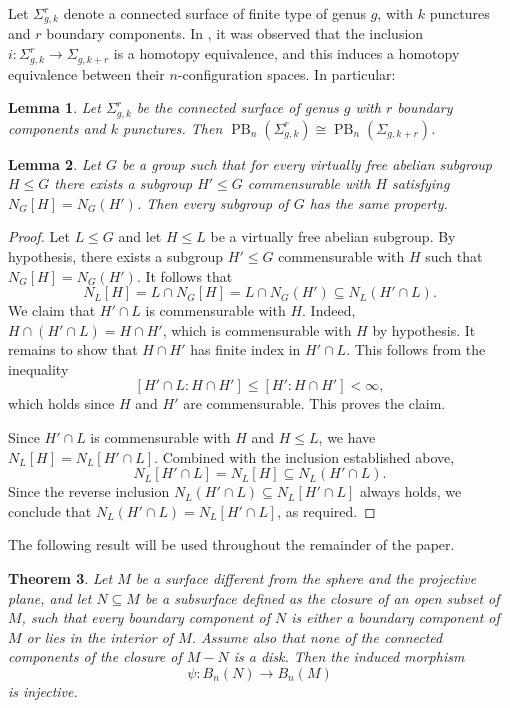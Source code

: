 \documentclass[a4paper,12pt,leqno]{amsart}
\newtheorem{theorem}{Theorem}[section]
\newtheorem{lemma}[theorem]{Lemma}
\theoremstyle{definition}
\DeclareMathOperator{\pb}{PB}
\begin{document}
Let $\Sigma_{g,k}^r$ denote a connected surface of finite type of genus $g$, with $k$ punctures and $r$ boundary components. In \cite[Remarks 8]{MR3382024}, it was observed that the inclusion $i\colon \Sigma_{g,k}^r \to \Sigma_{g,k+r}$ is a homotopy equivalence, and this induces a homotopy equivalence between their $n$-configuration spaces. In particular: %
\begin{lemma}\label{surfacebraid:puntures:boundaries}
    Let $\Sigma_{g,k}^r$ be the connected surface of genus $g$ with $r$ boundary components and  $k$ punctures. Then $\pb_n(\Sigma_{g,k}^r) \cong \pb_n(\Sigma_{g,k+r})$.
\end{lemma}

\begin{lemma}\label{property:pass:subgroup}
Let $G$ be a group such that for every virtually free abelian subgroup $H \leq G$
there exists a subgroup $H' \leq G$ commensurable with $H$ satisfying
$N_G[H] = N_G(H')$. Then every subgroup of $G$ has the same property.
\end{lemma}

\begin{proof}
Let $L \leq G$ and let $H \leq L$ be a virtually free abelian subgroup. By
hypothesis, there exists a subgroup $H' \leq G$ commensurable with $H$ such that
$N_G[H] = N_G(H')$. It follows that
\[
  N_L[H] = L \cap N_G[H] = L \cap N_G(H') \subseteq N_L(H' \cap L).
\]
We claim that $H' \cap L$ is commensurable with $H$. Indeed, $H \cap (H' \cap L)
= H \cap H'$, which is commensurable with $H$ by hypothesis. It remains to show
that $H \cap H'$ has finite index in $H' \cap L$. This follows from the inequality
\[
  [H' \cap L : H \cap H'] \leq [H' : H \cap H']  < \infty,
\]
which holds since $H$ and $H'$ are commensurable. This proves the claim.

Since $H' \cap L$ is commensurable with $H$ and $H \leq L$, we have $N_L[H] =
N_L[H' \cap L]$. Combined with the inclusion established above,
\[
  N_L[H' \cap L] = N_L[H] \subseteq N_L(H' \cap L).
\]
Since the reverse inclusion $N_L(H' \cap L) \subseteq N_L[H' \cap L]$ always
holds, we conclude that $N_L(H' \cap L) = N_L[H' \cap L]$, as required.
\end{proof}


The following result will be used throughout the remainder of the paper.

\begin{theorem}\cite[Proposition 2.2]{Paris:Rolfsen}\label{lemma:subsurface-injective}
Let \( M \) be a surface different from the sphere and the projective plane, and let \( N \subseteq M \) be a subsurface defined as the closure of an open subset of \( M \), such that every boundary component of \( N \) is either a boundary component of \( M \) or lies in the interior of \( M \). Assume also that none of the connected components of the closure of \( M - N \) is a disk. Then the induced morphism
\[
\psi \colon B_n(N) \to B_n(M)
\]
is injective.
\end{theorem}
\end{document}
